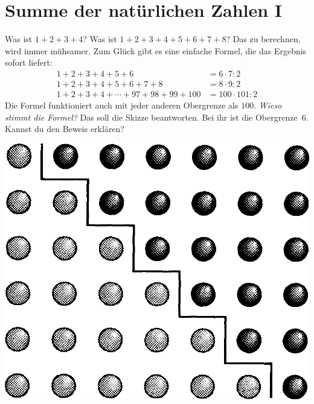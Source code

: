 \documentclass{../zirkelblatt}
\begin{document}
\section*{Summe der natürlichen Zahlen I}
Was ist $1 + 2 + 3 + 4$? Was ist $1 + 2 + 3 + 4 + 5 + 6 + 7 + 8$? Das zu
berechnen, wird immer mühsamer. Zum Glück gibt es eine einfache Formel, die das
Ergebnis sofort liefert:
\begin{align*}
  1 + 2 + 3 + 4 + 5 + 6 \phantom{{} + 7 + 8} &= 6 \cdot 7 : 2 \\
  1 + 2 + 3 + 4 + 5 + 6 + 7 + 8 &= 8 \cdot 9 : 2 \\
  1 + 2 + 3 + 4 + \cdots + 97 + 98 + 99 + 100 &= 100 \cdot 101 : 2
\end{align*}
Die Formel funktioniert auch mit jeder anderen Obergrenze als $100$. \emph{Wieso
stimmt die Formel?} Das soll die Skizze beantworten. Bei ihr ist die
Obergrenze~$6$. Kannst du den Beweis erklären?
\begin{center}
\includegraphics[scale=0.3]{kleiner-gauss-1}
\end{center}
\end{document}
